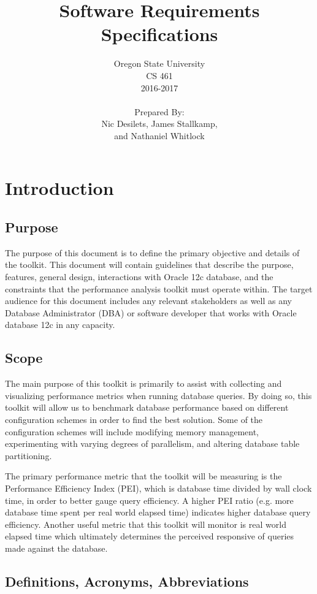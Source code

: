 \documentclass[draftclsnofoot, onecolumn, compsoc, 10pt]{IEEEtran}
\title{\huge Software Requirements Specifications}
\author{Oregon State University\\CS 461\\2016-2017\\\\Prepared By:\\Nic Desilets, James Stallkamp,\\and Nathaniel Whitlock}
\begin{document}
\begin{titlingpage}
    \maketitle 
\end{titlingpage}

\tableofcontents
\pagebreak

\section{Introduction}

\subsection{Purpose}
The purpose of this document is to define the primary objective and details of the toolkit.
This document will contain guidelines that describe the purpose, features, general design, interactions with Oracle 12c database, and the constraints that the performance analysis toolkit must operate within.
The target audience for this document includes any relevant stakeholders as well as any Database Administrator (DBA) or software developer that works with Oracle database 12c in any capacity.


\subsection{Scope}
The main purpose of this toolkit is primarily to assist with collecting and visualizing performance metrics when running database queries.
By doing so, this toolkit will allow us to benchmark database performance based on different configuration schemes in order to find the best solution.
Some of the configuration schemes will include modifying memory management, experimenting with varying degrees of parallelism, and altering database table partitioning. 

The primary performance metric that the toolkit will be measuring is the Performance Efficiency Index (PEI), which is database time divided by wall clock time, in order to better gauge query efficiency.
A higher PEI ratio (e.g. more database time spent per real world elapsed time) indicates higher database query efficiency.
Another useful metric that this toolkit will monitor is real world elapsed time which ultimately determines the perceived responsive of queries made against the database.

\subsection{Definitions, Acronyms, Abbreviations}
\end{document}
